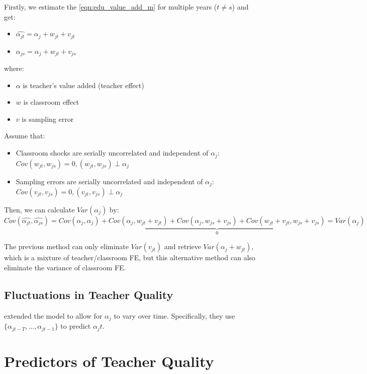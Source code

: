         Firstly, we estimate the \ref{eqn:edu_value_add_m} for multiple years ($t \neq s$) and get:
        \begin{itemize}
            \item $\widehat{\alpha_{jt}}=\alpha_j + w_{jt} + v_{jt}$
            \item $\widehat{\alpha_{js}}=\alpha_j + w_{jt} + v_{js}$
        \end{itemize}
        where:
        \begin{itemize}
            \item $\alpha$ is teacher's value added (teacher effect)
            \item $w$ is classroom effect
            \item $v$ is sampling error
        \end{itemize}
        Assume that:
        \begin{itemize}
            \item Classroom shocks are serially uncorrelated and independent of $\alpha_j$: $Cov(w_{jt},w_{js})=0, (w_{jt},w_{js})\perp \alpha_j$
            \item Sampling errors are serially uncorrelated and independent of $\alpha_j$: $Cov(v_{jt},v_{js})=0, (v_{jt},v_{js})\perp \alpha_j$
        \end{itemize}
        Then, we can calculate $Var(\alpha_j)$ by:
        $$Cov(\widehat{\alpha_{jt}},\widehat{\alpha_{js}}) = Cov(\alpha_j,\alpha_j) + \underbrace{Cov(\alpha_j,w_{jt}+v_{jt}) + Cov(\alpha_j,w_{js}+v_{js}) +Cov(w_{jt}+v_{jt},w_{js}+v_{js})}_{0} = Var(\alpha_j)$$

        The previous method can only eliminate $Var(v_{jt})$ and retrieve $Var(\alpha_j + w_{jt})$, which is a mixture of teacher/classroom FE, but this alternative method can also eliminate the variance of classroom FE.
        
    \subsection{Fluctuations in Teacher Quality}

        \cite{chetty_measuring_2014} extended the model to allow for $\alpha_j$ to vary over time. Specifically, they use $\{ \alpha_{jt-T},\dots,\alpha_{jt-1} \}$ to predict $\alpha_jt$.

\section{Predictors of Teacher Quality}

